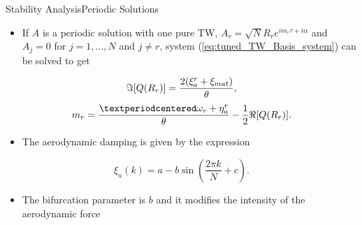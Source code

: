 \documentclass[dvipsnames, aspectratio = 169]{beamer}
\begin{document}
\begin{frame}{Stability Analysis}{Periodic Solutions}
	\begin{itemize}
		\item If $ A $ is a periodic solution with one pure TW, $ A_r = \sqrt{N}R_re^{im_r\tau+ i\alpha} $ and $ A_j = 0 $ for $ j = 1,...,N $ and $ j\neq r $, system (\ref{eq:tuned_TW_Basis_system}) can be solved to get
	\end{itemize}

	\begin{equation}\label{eq:realpart_stability_tuned}
		\imaginary[Q(R_r)] = \frac{2(\xi_a^r + \xi_{mat})}{\theta},
	\end{equation}
	\begin{equation}\label{eq:imagpart_stability_tuned}
		m_r = \frac{·\omega_r + \eta_a^r}{\theta} - \frac{1}{2}\real[Q(R_r)].
	\end{equation}
	\begin{itemize}
		\item The aerodynamic damping is given by the expression
	\end{itemize}

	\begin{equation}\label{eq:recall_xi}
		\xi_a(k) = a - b\sin(\dfrac{2\pi k}{N} + c).
	\end{equation}
	\begin{itemize}
		\item The bifurcation parameter is $ b $ and it modifies the intensity of the aerodynamic force
	\end{itemize}
\end{frame}
\end{document}
